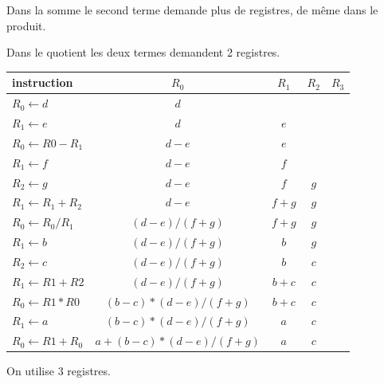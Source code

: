 \begin{Exercise}
Dans la somme le second terme demande plus de registres, de même dans le produit.

Dans le quotient les deux termes demandent 2 registres.
  \begin{center}
    \begin{tabular}{l|c|c|c|c}
       instruction&$R_0$&$R_1$&$R_2$&$R_3$ \\
       \hline
       $R_0 \leftarrow d$& $d$&&&\\
       $R_1 \leftarrow e$& $d$&$e$&&\\
       $R_0 \leftarrow R0-R_1$       &$d-e$                 &$e$          &      &\\
       $R_1 \leftarrow f$            &$d-e$                 &$f$          &      &\\
       $R_2 \leftarrow g$            &$d-e$                 &$f$          &$g$   &\\
       $R_1 \leftarrow R_1+R_2$      &$d-e$                 &$f+g$        &$g$   &\\
       $R_0 \leftarrow R_0/R_1$      &$(d-e)/(f+g)$         &$f+g$        &$g$   &\\
       $R_1 \leftarrow b$            &$(d-e)/(f+g)$         &$b$          &$g$   &\\
       $R_2 \leftarrow c$            &$(d-e)/(f+g)$         &$b$          &$c$   &\\
       $R_1 \leftarrow R1+R2$        &$(d-e)/(f+g)$         &$b+c$        &$c$   &\\
       $R_0 \leftarrow R1*R0$        &$(b-c)*(d-e)/(f+g)$   &$b+c$        &$c$   &\\
       $R_1 \leftarrow a$            &$(b-c)*(d-e)/(f+g)$   &$a$          &$c$   &\\
       $R_0 \leftarrow R1+R_0$       &$a+(b-c)*(d-e)/(f+g)$ &$a$          &$c$   &\\
    \end{tabular}
  \end{center}
  On utilise 3 registres.
\end{Exercise}
\newpage
